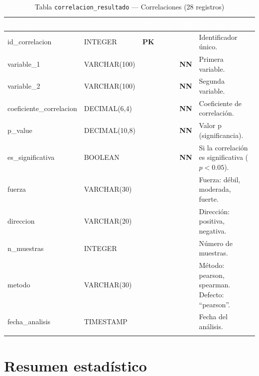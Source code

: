 \documentclass[11pt,a4paper]{article}
\newcommand{\tableheadrow}{\rowcolor{tableheader}}
\newcommand{\tablehead}[1]{\textcolor{white}{\textbf{#1}}}
\newcommand{\pk}{\textcolor{emiblue}{\textbf{PK}}}
\newcommand{\nn}{\textcolor{red!70!black}{\textbf{NN}}}
\begin{document}
\begin{longtable}{p{4.2cm} p{2.8cm} c c c p{4.5cm}}
\toprule
\tableheadrow
\tablehead{Campo} & \tablehead{Tipo} & \tablehead{PK} & \tablehead{FK} & \tablehead{NN} & \tablehead{Descripción} \\
\midrule
\endhead
id\_correlacion & INTEGER & \pk & & & Identificador único. \\
\rowcolor{tablerow}
variable\_1 & VARCHAR(100) & & & \nn & Primera variable. \\
variable\_2 & VARCHAR(100) & & & \nn & Segunda variable. \\
\rowcolor{tablerow}
coeficiente\_correlacion & DECIMAL(6,4) & & & \nn & Coeficiente de correlación. \\
p\_value & DECIMAL(10,8) & & & \nn & Valor p (significancia). \\
\rowcolor{tablerow}
es\_significativa & BOOLEAN & & & \nn & Si la correlación es significativa ($p < 0.05$). \\
fuerza & VARCHAR(30) & & & & Fuerza: débil, moderada, fuerte. \\
\rowcolor{tablerow}
direccion & VARCHAR(20) & & & & Dirección: positiva, negativa. \\
n\_muestras & INTEGER & & & & Número de muestras. \\
\rowcolor{tablerow}
metodo & VARCHAR(30) & & & & Método: pearson, spearman. Defecto: ``pearson''. \\
fecha\_analisis & TIMESTAMP & & & & Fecha del análisis. \\
\bottomrule
\caption{Tabla \texttt{correlacion\_resultado} — Correlaciones (28 registros)}
\end{longtable}

\section{Resumen estadístico}
\end{document}
